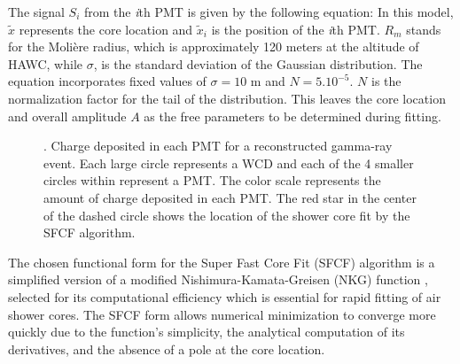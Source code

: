 The signal $S_i$ from the \textit{i}th PMT is given by the following equation:
\showercore
In this model, $\tilde{x}$ represents the core location and $\tilde{x}_i$ is the position of the \textit{i}th PMT.
$R_m$ stands for the Molière radius, which is approximately 120 meters at the altitude of HAWC, while $\sigma$, is the standard deviation of the Gaussian distribution.
The equation incorporates fixed values of $\sigma = 10$ m and $N=5.10^{-5}$.
$N$ is the normalization factor for the tail of the distribution.
This leaves the core location and overall amplitude $A$ as the free parameters to be determined during fitting.

\begin{figure}
    \caption{. Charge deposited in each PMT for a reconstructed gamma-ray event. Each large circle represents a WCD and each of the 4 smaller circles within represent a PMT. The color scale represents the amount of charge deposited in each PMT. The red star in the center of the dashed circle shows the location of the shower core fit by the SFCF algorithm. \cite{Abeysekara_2017}}
    \label{fig:core_fitter}
\end{figure}

The chosen functional form for the Super Fast Core Fit (SFCF) algorithm is a simplified version of a modified Nishimura-Kamata-Greisen (NKG) function \cite{cosmic_ray_shape}, selected for its computational efficiency which is essential for rapid fitting of air shower cores. The SFCF form allows numerical minimization to converge more quickly due to the function's simplicity, the analytical computation of its derivatives, and the absence of a pole at the core location.

